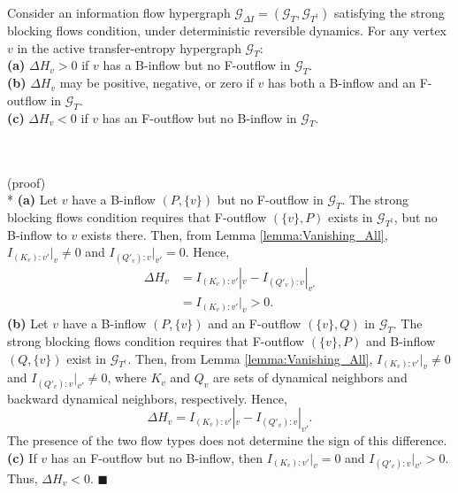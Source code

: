 \documentclass{comnet}%
\begin{document}
\begin{lemma}
	Consider an information flow hypergraph $\mathcal{G}_{\Delta I} = (\mathcal{G}_{T}, \mathcal{G}_{T^{\dagger}})$ satisfying the strong blocking flows condition, under deterministic reversible dynamics. For any vertex $v$ in the active transfer-entropy hypergraph $\mathcal{G}_{T}$:\\
	\textbf{(a)} $\Delta H_{v} > 0$ if $v$ has a B-inflow but no F-outflow in $\mathcal{G}_{T}$.\\
	\textbf{(b)} $\Delta H_{v}$ may be positive, negative, or zero if $v$ has both a B-inflow and an F-outflow in $\mathcal{G}_{T}$.\\
 \textbf{(c)} $\Delta H_v<0$ if $v$ has an F-outflow but no B-inflow in $\mathcal G_T$.\\
	\label{lemma:Balance_of_H_v}\end{lemma}
\quad \\ \quad \\(proof)\\*
\textbf{(a)} Let $v$ have a B-inflow $(P,\{v\})$ but no F-outflow in $\mathcal G_T$. The strong blocking flows condition requires that F-outflow $(\{v\},P)$ exists in $\mathcal G_{T^{\dagger}}$, but no B-inflow to $v$ exists there. Then, from Lemma \ref{lemma:Vanishing_All}, $I_{(K_v):v'}|_v\ne 0$ and $I_{(Q'_v):v}|_{v'}=0$. Hence,
\begin{equation}\begin{aligned}
 \Delta H_v&=I_{(K_v):v'}|_v-I_{(Q'_v):v}|_{v'}\\
 &=I_{(K_v):v'}|_v>0.
\end{aligned}\end{equation}
\textbf{(b)} Let $v$ have a B-inflow $(P,\{v\})$ and an F-outflow $(\{v\},Q)$ in $\mathcal G_T$. The strong blocking flows condition requires that F-outflow $(\{v\},P)$ and B-inflow $(Q,\{v\})$ exist in $\mathcal G_{T^{\dagger}}$. Then, from Lemma \ref{lemma:Vanishing_All}, $I_{(K_v):v'}|_v\ne 0$ and $I_{(Q'_v):v}|_{v'}\ne 0$, where $K_v$ and $Q_v$ are sets of dynamical neighbors and backward dynamical neighbors, respectively. Hence,
\begin{equation}
 \Delta H_v=I_{(K_v):v'}|_v-I_{(Q'_v):v}|_{v'}.
\end{equation}
The presence of the two flow types does not determine the sign of this difference.\\
\textbf{(c)} If $v$ has an F-outflow but no B-inflow, then $I_{(K_v):v'}|_v=0$ and $I_{(Q'_v):v}|_{v'}>0$. Thus, $\Delta H_v<0$. $\blacksquare$\\
\end{document}
